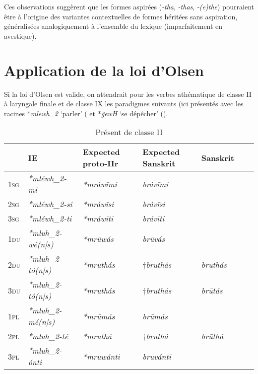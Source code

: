 \documentclass[oldfontcommands,oneside,a4paper,11pt]{article}
\newcommand{\ipa}[1]{{\phon\textit{#1}}} %
\newcommand{\grise}[1]{\cellcolor{lightgray}\textbf{#1}}
\begin{document}
Ces observations suggèrent que les formes aspirées (\ipa{-tha}, \ipa{-thas}, \ipa{-(e)the}) pourraient être à l'origine des variantes contextuelles de formes héritées sans aspiration, généralisées analogiquement à l'ensemble du lexique (imparfaitement en avestique).

\section{Application de la loi d'Olsen}
Si la loi d'Olsen est valide, on attendrait pour les verbes athématique de classe II à laryngale finale et de classe IX les paradigmes suivants (ici présentés avec les racines *\ipa{mlewh_2} `parler' (\citealt[446]{liv} et *\ipa{ĝewH} `se dépêcher' (\citealt[166]{liv}).


\begin{table}[H]
\caption{Présent de classe II} \label{tab:II}
\begin{tabular}{lllllll}
\toprule
 & 	IE  & 	Expected proto-IIr & 	Expected Sanskrit & 	Sanskrit   	\\
\midrule
\textsc{1sg} & 	\ipa{*mléwh_2-mi} & 	\ipa{*mráwīmi} & 	\ipa{brávīmi} & 	  & 	\\
\textsc{2sg} & 	\ipa{*mléwh_2-si} & 	\ipa{*mráwīsi} & 	\ipa{brávīsi} & 	 & 	\\
\textsc{3sg} & 	\ipa{*mléwh_2-ti} & 	\ipa{*mráwīti} & 	\ipa{brávīti} &   & 	\\
\textsc{1du} & 	\ipa{*mluh_2-wé(n|s)} & 	\ipa{*mrūwás} & 	\ipa{brūvás} & 	  & 	\\
\textsc{2du} & 	\ipa{*mluh_2-tó(n|s)} & 	\ipa{*mruthás} \grise{}& 	$\dagger$\ipa{bruthás} \grise{}& 	\ipa{brūthás} & 	\\
\textsc{3du} & 	\ipa{*mluh_2-tó(n|s)} & 	\ipa{*mruthás}  \grise{} & $\dagger$\ipa{bruthás} \grise{} & 	\ipa{brūtás} & 	\\
\textsc{1pl} & 	\ipa{*mluh_2-mé(n|s)} & 	\ipa{*mrūmás} & 	\ipa{brūmás} & 	  & 	\\
\textsc{2pl} & 	\ipa{*mluh_2-té} & 	\ipa{*mruthá}  \grise{}& 	$\dagger$\ipa{bruthá}  \grise{}& 	\ipa{brūthá} & 	\\
\textsc{3pl} & 	\ipa{*mluh_2-ónti} & 	\ipa{*mruwánti} & 	\ipa{bruvánti} &  & 	\\
\bottomrule
\end{tabular}
\end{table}
\end{document}
